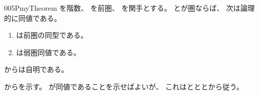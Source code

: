 \documentclass[index]{subfiles}
\begin{document}
\begin{myBlock}{005P}{myTheorem}
  を階数、
  を前圏、
  を関手とする。
  とが圏ならば、
  次は論理的に同値である。
  \begin{enumerate}
  \item \label{005P:0000} は前圏の同型である。
  \item \label{005P:0001} は弱圏同値である。
  \end{enumerate}
\end{myBlock}
\begin{myProof}
  からは自明である。

  からを示す。
  が同値であることを示せばよいが、
  これはとととから従う。
\end{myProof}
\end{document}
